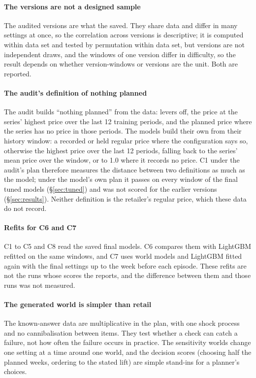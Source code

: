 \paragraph{The versions are not a designed sample}
The audited versions are what the \companion{}  saved. They share data and
differ in many settings at once, so the correlation across versions is
descriptive; it is computed within data set and tested by permutation within
data set, but versions are not independent draws, and the windows of one
version differ in difficulty, so the result depends on whether version-windows
or versions are the unit. Both are reported.

\paragraph{The audit's definition of nothing planned}
The audit builds ``nothing planned'' from the data: levers off, the price at
the series' highest price over the last 12 training periods, and the planned
price where the series has no price in those periods. The models build their
own from their history window: a recorded or held regular price where the
configuration says so, otherwise the highest price over the last 12 periods,
falling back to the series' mean price over the window, or to 1.0 where it
records no price. C1 under the audit's plan therefore measures the distance
between two definitions as much as the model; under the model's own plan it
passes on every window of the final tuned models (\S\ref{sec:tuned}) and was not
scored for the earlier versions (\S\ref{sec:results}). Neither
definition is the retailer's regular price, which these data do not record.

\paragraph{Refits for C6 and C7}
C1 to C5 and C8 read the saved final models. C6 compares them with LightGBM
refitted on the same windows, and C7 uses world models and LightGBM fitted
again with the final settings up to the week before each episode. These refits
are not the runs whose scores the \companion{}  reports, and the difference
between them and those runs was not measured.

\paragraph{The generated world is simpler than retail}
The known-answer data are multiplicative in the plan, with one shock process
and no cannibalisation between items. They test whether a check can catch a
failure, not how often the failure occurs in practice. The sensitivity worlds change one setting at a
time around one world, and the decision scores (choosing half the planned weeks, ordering to the stated
lift) are simple stand-ins for a planner's choices.
